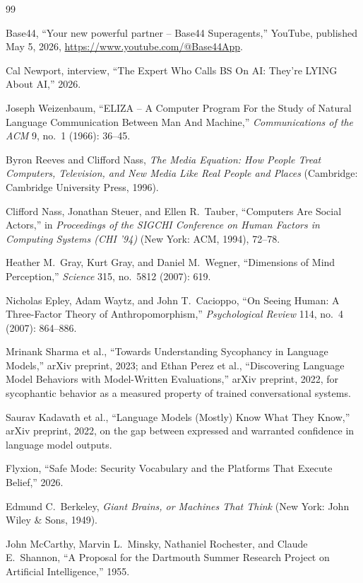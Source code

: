 \documentclass[11pt]{article}
\begin{document}
\begin{thebibliography}{99}

 Base44, ``Your new powerful partner -- Base44 Superagents,'' YouTube, published May 5, 2026, \url{https://www.youtube.com/@Base44App}.

 Cal Newport, interview, ``The Expert Who Calls BS On AI: They're LYING About AI,'' 2026.

 Joseph Weizenbaum, ``ELIZA -- A Computer Program For the Study of Natural Language Communication Between Man And Machine,'' \emph{Communications of the ACM} 9, no.\ 1 (1966): 36--45.

 Byron Reeves and Clifford Nass, \emph{The Media Equation: How People Treat Computers, Television, and New Media Like Real People and Places} (Cambridge: Cambridge University Press, 1996).

 Clifford Nass, Jonathan Steuer, and Ellen R.\ Tauber, ``Computers Are Social Actors,'' in \emph{Proceedings of the SIGCHI Conference on Human Factors in Computing Systems (CHI '94)} (New York: ACM, 1994), 72--78.

 Heather M.\ Gray, Kurt Gray, and Daniel M.\ Wegner, ``Dimensions of Mind Perception,'' \emph{Science} 315, no.\ 5812 (2007): 619.

 Nicholas Epley, Adam Waytz, and John T.\ Cacioppo, ``On Seeing Human: A Three-Factor Theory of Anthropomorphism,'' \emph{Psychological Review} 114, no.\ 4 (2007): 864--886.

 Mrinank Sharma et al., ``Towards Understanding Sycophancy in Language Models,'' arXiv preprint, 2023; and Ethan Perez et al., ``Discovering Language Model Behaviors with Model-Written Evaluations,'' arXiv preprint, 2022, for sycophantic behavior as a measured property of trained conversational systems.

 Saurav Kadavath et al., ``Language Models (Mostly) Know What They Know,'' arXiv preprint, 2022, on the gap between expressed and warranted confidence in language model outputs.

 Flyxion, ``Safe Mode: Security Vocabulary and the Platforms That Execute Belief,'' 2026.

 Edmund C.\ Berkeley, \emph{Giant Brains, or Machines That Think} (New York: John Wiley \& Sons, 1949).

 John McCarthy, Marvin L.\ Minsky, Nathaniel Rochester, and Claude E.\ Shannon, ``A Proposal for the Dartmouth Summer Research Project on Artificial Intelligence,'' 1955.


\end{thebibliography}
\end{document}
